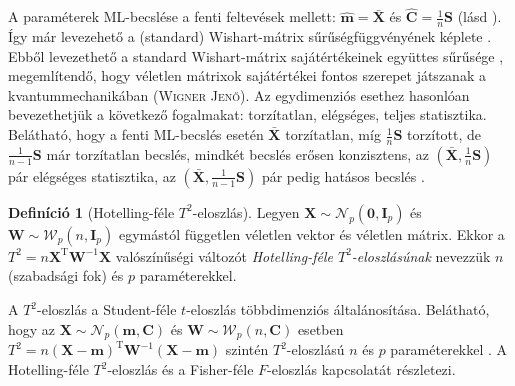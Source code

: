 \documentclass[%
	DIV=15,appendixprefix]{scrreprt}
\theoremstyle{definition}
\newtheorem*{defin}{Definíció}
\theoremstyle{remark}
\newcommand{\normald}{\mathcal{N}}
\newcommand{\wishartd}{\mathcal{W}}
\DeclareMathOperator{\T}{T}
\begin{document}
A paraméterek ML-becslése a fenti feltevések mellett: $ \hat{ \mathbf{ m } } =
\bar{ \mathbf{ X } } $ és $ \hat{ \mathbf{ C } } = \frac{ 1 }{ n } \mathbf{ S } $ (lásd
\cite[5.~fejezet, 5.~szakasz, 5.1.~tétel]{BollaKramli}). Így már levezehető a (standard)
Wishart-mátrix sűrűségfüggvényének képlete \cite[5.~fejezet, 5.~szakasz, 5.2. és
5.3.~tétel]{BollaKramli}. Ebből levezethető a standard Wishart-mátrix sajátértékeinek együttes
sűrűsége \cite[5.~fejezet, 5.~szakasz, 5.4.~tétel]{BollaKramli}, megemlítendő, hogy véletlen
mátrixok sajátértékei fontos szerepet játszanak a kvantummechanikában (\textsc{Wigner Jenő}).
%
Az egydimenziós esethez hasonlóan bevezethetjük a következő fogalmakat: torzítatlan, elégséges,
teljes statisztika. Belátható, hogy a fenti ML-becslés esetén $ \bar{ \mathbf{ X } } $ torzítatlan,
míg $ \frac{ 1 }{ n } \mathbf{ S } $ torzított, de $ \frac{ 1 }{ n - 1 } \mathbf{ S } $ már
torzítatlan becslés, mindkét becslés erősen konzisztens, az $ \left(  \bar{ \mathbf{ X } },{}
\frac{ 1 }{ n } \mathbf{ S } \right) $ pár elégséges statisztika, az $ \left(
\bar{ \mathbf{ X } },{} \frac{ 1 }{ n - 1 } \mathbf{ S } \right) $ pár pedig hatásos becslés
\cite[5. fejezet, 6. szakasz eleje]{BollaKramli}.
\begin{defin}[Hotelling-féle $ T^{ 2 } $-eloszlás]
	Legyen $ \mathbf{ X } \sim \normald_{ p } \left( \mathbf{ 0 },{} \mathbf{ I }_{ p } \right) $ és
	$ \mathbf{ W } \sim \wishartd_{ p } \left( n,{} \mathbf{ I }_{ p } \right) $ egymástól független
	véletlen vektor és véletlen mátrix. Ekkor a $ T^{ 2 } = n \mathbf{ X }^{ \T }
	\mathbf{ W }^{ - 1 } \mathbf{ X } $ valószínűségi változót \emph{Hotelling-féle
	$ T^{ 2 }$-eloszlásúnak} nevezzük $ n $ (szabadsági fok) és $ p $ paraméterekkel.
\end{defin}
A $ T^{ 2 } $-eloszlás a Student-féle $ t $-eloszlás többdimenziós általánosítása. Belátható, hogy
az $ \mathbf{ X } \sim \normald_{ p } \left( \mathbf{ m },{} \mathbf{ C } \right) $ és
$ \mathbf{ W } \sim \wishartd_{ p } \left( n,{} \mathbf{ C } \right) $ esetben $ T^{ 2 } = n \left(
\mathbf{ X } - \mathbf{ m } \right)^{ \T } \mathbf{ W }^{ - 1 } \left( \mathbf{ X } - \mathbf{ m }
\right) $ szintén $ T^{ 2 } $-eloszlású $ n $ és $ p $ paraméterekkel \cite[5.~fejezet, 6.~szakasz,
6.1.~állítás]{BollaKramli}. A Hotelling-féle $ T^{ 2 } $-eloszlás és a Fisher-féle $ F $-eloszlás
kapcsolatát \cite[5.~fejezet, 6.~szakasz, 6.2.~tétel]{BollaKramli} részletezi.
\end{document}
